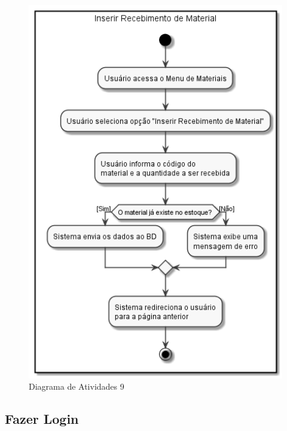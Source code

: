 \documentclass[rascunho,xindy,acronym,symbols]{fei}
\begin{document}
\begin{figure}[H]
    \centering
    \includegraphics[scale=0.6, width=400pt]{./Images/Inserir_Recebimento_de_Material.png}
    \caption{Diagrama de Atividades 9}
    \label{fig:diag_atv9}
\end{figure}

\subsection{Fazer Login}
\end{document}
